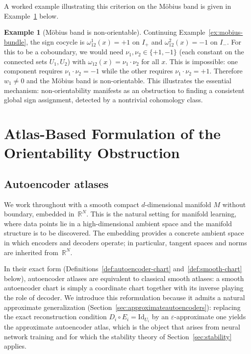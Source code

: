 \documentclass[11pt]{article}
\newcommand{\R}{\mathbb{R}}
\theoremstyle{plain}
\theoremstyle{definition}
\newtheorem{example}[theorem]{Example}
\theoremstyle{remark}
\begin{document}
A worked example illustrating this criterion on the M\"obius band is given in Example~\ref{ex:mobius-nonorientable} below.

\begin{example}[M\"obius band is non-orientable]\label{ex:mobius-nonorientable}
Continuing Example~\ref{ex:mobius-bundle}, the sign cocycle is $\omega^1_{12}(x)=+1$ on $I_+$ and $\omega^2_{12}(x)=-1$ on $I_-$. For this to be a coboundary, we would need $\nu_1,\nu_2\in\{+1,-1\}$ (each constant on the connected sets $U_1,U_2$) with $\omega_{12}(x)=\nu_1\cdot\nu_2$ for all $x$. This is impossible: one component requires $\nu_1\cdot\nu_2=-1$ while the other requires $\nu_1\cdot\nu_2=+1$. Therefore $w_1\neq 0$ and the M\"obius band is non-orientable. This illustrates the essential mechanism: non-orientability manifests as an obstruction to finding a consistent global sign assignment, detected by a nontrivial cohomology class.
\end{example}


\section{Atlas-Based Formulation of the Orientability Obstruction}\label{sec:atlasbasedformulation}

\subsection{Autoencoder atlases}\label{sec:autoencoders}

We work throughout with a smooth compact $d$-dimensional manifold $M$ without boundary, embedded in~$\R^N$. This is the natural setting for manifold learning, where data points lie in a high-dimensional ambient space and the manifold structure is to be discovered. The embedding provides a concrete ambient space in which encoders and decoders operate; in particular, tangent spaces and norms are inherited from~$\R^N$.

In their exact form (Definitions~\ref{def:autoencoder-chart} and~\ref{def:smooth-chart} below), autoencoder atlases are equivalent to classical smooth atlases: a smooth autoencoder chart is simply a coordinate chart together with its inverse playing the role of decoder. We introduce this reformulation because it admits a natural approximate generalization (Section~\ref{sec:approximateautoencoders}): replacing the exact reconstruction condition $D_i \circ E_i = \mathrm{Id}_{U_i}$ by an $\varepsilon$-approximate one yields the approximate autoencoder atlas, which is the object that arises from neural network training and for which the stability theory of Section~\ref{sec:stability} applies.
\end{document}
